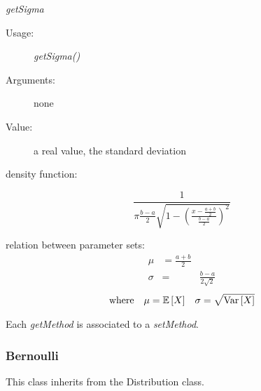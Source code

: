 \begin{description}
\begin{description}
\item \textit{getSigma}
\begin{description}
\item[Usage:] \textit{getSigma()}
\item[Arguments:] none
\item[Value:]  a real value, the standard deviation
\end{description}



\end{description}

\item[Details:]  \rule{0pt}{1em}
\begin{description}
\item density function:

\begin{equation}
\frac{1}{\pi\frac{b-a}{2}\sqrt{1-\left(\frac{x-\frac{a+b}{2}}{\frac{b-a}{2}}\right)^{2}}}
\end{equation}

\item relation between parameter sets:
\begin{eqnarray*}
\mu                                       &       =       \frac{a+b}{2}   \\
\sigma                            &  =    &       \frac{b-a}{2\sqrt{2}}
\end{eqnarray*}
\begin{align*}
\mbox{where}
&&
\mu = {\mathbb E}\left[ X \right]
&&
\sigma = \sqrt{{\rm Var}\left[ X \right] }
\end{align*}
\end{description}
\bigskip

\item[Links:]  \rule{0pt}{1em}

\end{description}


Each  \textit{getMethod}  is associated to a \textit{setMethod}.

\newpage
\subsubsection{Bernoulli}

This class inherits from the Distribution class.

